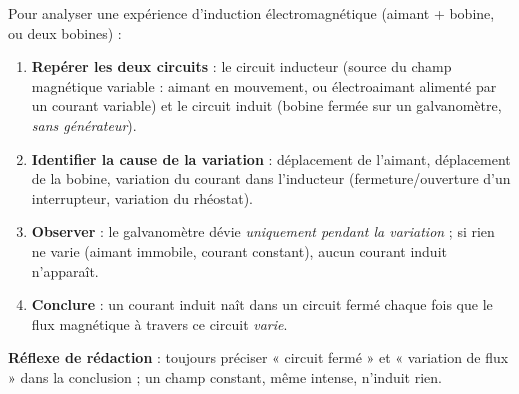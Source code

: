 \documentclass[11pt]{article}
\newcommand{\cle}[1]{{\popxbold\color{popdark}#1}}
\begin{document}
\begin{methode}
Pour analyser une expérience d'induction électromagnétique (aimant + bobine, ou deux bobines) :
\begin{enumerate}
\item \textbf{Repérer les deux circuits} : le \cle{circuit inducteur} (source du champ magnétique variable : aimant en mouvement, ou électroaimant alimenté par un courant variable) et le \cle{circuit induit} (bobine fermée sur un galvanomètre, \emph{sans générateur}).
\item \textbf{Identifier la cause de la variation} : déplacement de l'aimant, déplacement de la bobine, variation du courant dans l'inducteur (fermeture/ouverture d'un interrupteur, variation du rhéostat).
\item \textbf{Observer} : le galvanomètre dévie \emph{uniquement pendant la variation} ; si rien ne varie (aimant immobile, courant constant), aucun courant induit n'apparaît.
\item \textbf{Conclure} : un courant induit naît dans un circuit fermé chaque fois que le flux magnétique à travers ce circuit \emph{varie}.
\end{enumerate}
\textbf{Réflexe de rédaction} : toujours préciser « circuit fermé » et « variation de flux » dans la conclusion ; un champ constant, même intense, n'induit rien.
\end{methode}
\end{document}
